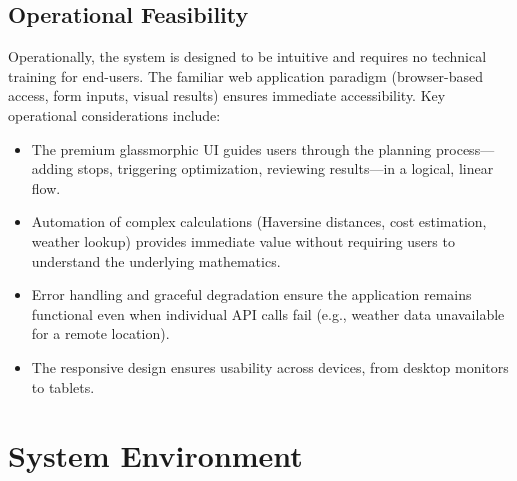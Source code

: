 \subsection{Operational Feasibility}
Operationally, the system is designed to be intuitive and requires no technical training for end-users. The familiar web application paradigm (browser-based access, form inputs, visual results) ensures immediate accessibility. Key operational considerations include:
\begin{itemize}
    \item The premium glassmorphic UI guides users through the planning process---adding stops, triggering optimization, reviewing results---in a logical, linear flow.
    \item Automation of complex calculations (Haversine distances, cost estimation, weather lookup) provides immediate value without requiring users to understand the underlying mathematics.
    \item Error handling and graceful degradation ensure the application remains functional even when individual API calls fail (e.g., weather data unavailable for a remote location).
    \item The responsive design ensures usability across devices, from desktop monitors to tablets.
\end{itemize}

\section{System Environment}

